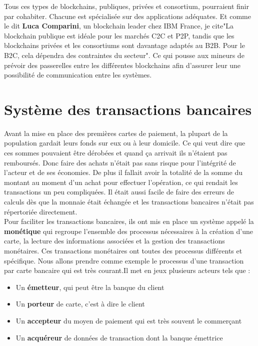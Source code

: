 \documentclass[12pt]{report}
\begin{document}
\hspace{1cm} Tous ces types de blockchains, publiques, privées et consortium, pourraient finir par cohabiter. Chacune est spécialisée sur des applications adéquates. Et comme le dit  \textbf{Luca Comparini}, un blockchain leader chez IBM France, je cite"La blockchain publique est idéale pour les marchés C2C et P2P, tandis que les blockchains privées et les consortiums sont davantage adaptés au B2B. Pour le B2C, cela dépendra des contraintes du secteur".  Ce qui pousse aux mineurs de prévoir des passerelles entre les différentes blockchains afin d'assurer leur une possibilité de communication entre les systèmes.\\


\newpage
\section{Système des transactions bancaires}

\hspace{1cm} Avant la mise en place des premières cartes de paiement, la plupart de la population gardait leurs fonds sur eux ou à leur domicile. Ce qui veut dire que ces sommes pouvaient être dérobées et quand ça arrivait ils n'étaient pas remboursés. Donc faire des achats n'était pas sans risque pour l'intégrité de l'acteur et de ses économies. De plus il fallait avoir la totalité de la somme du montant au moment d'un achat pour effectuer l'opération, ce qui rendait les transactions un peu compliquées. Il était aussi facile de faire des erreurs de calculs dès que la monnaie était échangée et les transactions bancaires n'était pas répertoriée directement.\\

\hspace{1cm} Pour faciliter les transactions bancaires, ils ont mis en place un système appelé la \textbf{monétique} qui regroupe l'ensemble des processus nécessaires à la création d'une carte, la lecture des informations associées et la gestion des transactions monétaires. Ces transactions monétaires ont toutes des processus différents et spécifique. Nous allons prendre comme exemple le processus d'une transaction par carte bancaire qui est très courant.Il met en jeux plusieurs acteurs tels que : 

\begin{itemize}
    \item Un \textbf{émetteur}, qui peut être la banque du client
    \item Un \textbf{porteur} de carte, c'est à dire le client
    \item Un \textbf{accepteur} du moyen de paiement qui est très souvent le commerçant
    \item Un \textbf{acquéreur} de données de transaction dont la banque émettrice
\end{itemize}
\end{document}
